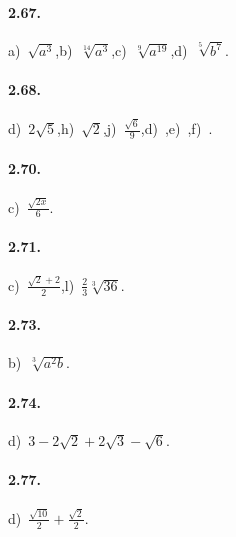\paragraph{2.67.}
a)~$\sqrt{a^3}$,\quad b)~$\sqrt[14]{a^3}$,\quad c)~$\sqrt[9]{a^{19}}$,\quad d)~$\sqrt[5]{b^7}$.

\paragraph{2.68.}
d)~$2\sqrt 5$,\quad h)~$\sqrt 2$,\quad j)~$\frac{\sqrt 6} 9$,\quad d)~,\quad e)~,\quad f)~.

\paragraph{2.70.}
c)~$\frac{\sqrt{2x}} 6$.

\paragraph{2.71.}
c)~$\frac{\sqrt 2+2} 2$,\quad l)~$\frac 2 3\sqrt[3]{36}$.

\paragraph{2.73.}
b)~$\sqrt[3]{a^2b}$.

\paragraph{2.74.}
d)~$3-2\sqrt 2+2\sqrt 3-\sqrt 6$.

\paragraph{2.77.}
d)~$\frac{\sqrt{10}} 2+\frac{\sqrt 2} 2$.

